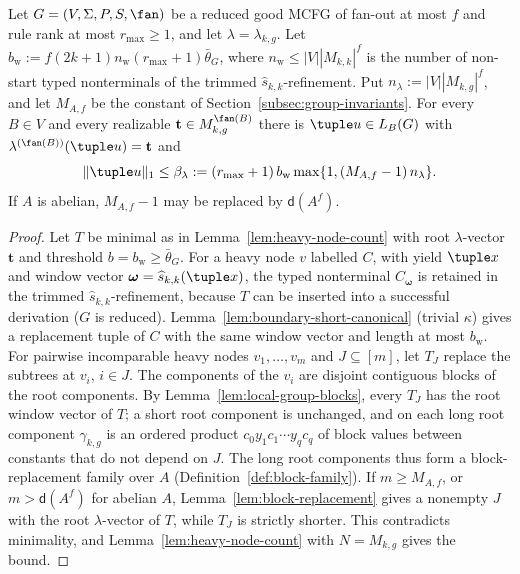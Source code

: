 \begin{lemma}
\label{lem:local-group-shortest}
Let $G=(V,\Sigma,P,S,\fan)$ be a reduced good MCFG of fan-out at most
$f$ and rule rank at most $r_{\max}\ge1$, and let $\lambda=\lambda_{k,g}$.
Let $b_{\mathrm w}:=f(2k+1)n_{\mathrm w}(r_{\max}+1)\bar\theta_G$, where
$n_{\mathrm w}\le|V||M_{k,k}|^f$ is the number of non-start typed
nonterminals of the trimmed $\widehat{s}_{k,k}$-refinement.  Put
$n_\lambda:=|V||M_{k,g}|^f$, and let $M_{A,f}$ be the constant of
Section~\ref{subsec:group-invariants}.  For every $B\in V$ and every
realizable $\mathbf t\in M_{k,g}^{\fan(B)}$ there is $\tuple u\in L_B(G)$
with $\lambda^{(\fan(B))}(\tuple u)=\mathbf t$ and
\[
 \|\tuple u\|_1\le\beta_\lambda:=(r_{\max}+1)\,b_{\mathrm w}
 \max\{1,(M_{A,f}-1)\,n_\lambda\}.
\]
If $A$ is abelian, $M_{A,f}-1$ may be replaced by $\mathsf d(A^f)$.
\end{lemma}

\begin{proof}
Let $T$ be minimal as in Lemma~\ref{lem:heavy-node-count} with root
$\lambda$-vector $\mathbf t$ and threshold $b=b_{\mathrm w}\ge\bar\theta_G$.
For a heavy node $v$ labelled $C$, with yield $\tuple x$ and window vector
$\boldsymbol\omega=\widehat{s}_{k,k}(\tuple x)$, the typed nonterminal
$C_{\boldsymbol\omega}$ is retained in the trimmed $\widehat{s}_{k,k}$-refinement,
because $T$ can be inserted into a successful derivation ($G$ is reduced).
Lemma~\ref{lem:boundary-short-canonical} (trivial $\kappa$) gives a
replacement tuple of $C$ with the same window vector and length at most
$b_{\mathrm w}$.  For pairwise incomparable heavy nodes $v_1,\ldots,v_m$ and
$J\subseteq[m]$, let $T_J$ replace the subtrees at $v_i$, $i\in J$.  The
components of the $v_i$ are disjoint contiguous blocks of the root components.
By Lemma~\ref{lem:local-group-blocks}, every $T_J$ has the root window vector of
$T$; a short root component is unchanged, and on each long root component
$\gamma_{k,g}$ is an ordered product $c_0y_1c_1\cdots y_qc_q$ of block values
between constants that do not depend on $J$.  The long root components thus
form a block-replacement family over $A$
(Definition~\ref{def:block-family}).  If $m\ge M_{A,f}$, or $m>\mathsf d(A^f)$
for abelian $A$, Lemma~\ref{lem:block-replacement} gives a nonempty $J$ with
the root $\lambda$-vector of $T$, while $T_J$ is strictly shorter.  This
contradicts minimality, and Lemma~\ref{lem:heavy-node-count} with
$N=M_{k,g}$ gives the bound.
\end{proof}

